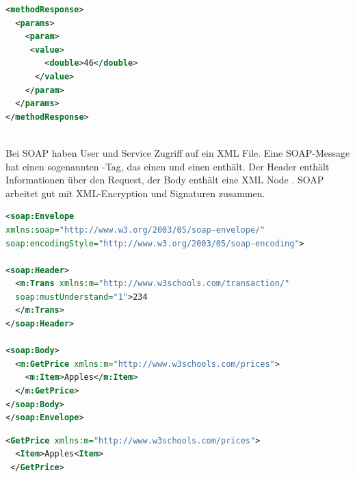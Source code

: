 \hfill
\begin{minipage}{0.45\textwidth}
\begin{lstlisting}[language=XML, caption={Web Service Response}, label=lst:webserviceresponse]
<methodResponse>
  <params>
	<param>
	 <value>
        <double>46</double>
      </value>
    </param>
  </params>
</methodResponse>
\end{lstlisting}
\end{minipage}\\
Bei SOAP haben User und Service Zugriff auf ein XML File. Eine SOAP-Message hat einen sogenannten -Tag, das einen  und einen  enthält. Der Header enthält Informationen über den Request, der Body enthält eine XML Node	. SOAP arbeitet gut mit XML-Encryption und Signaturen zusammen.\\
\begin{minipage}{0.45\textwidth}
\begin{lstlisting}[language=XML, caption={SOAP-Envelope}, label=lst:soapenvelope]
<soap:Envelope
xmlns:soap="http://www.w3.org/2003/05/soap-envelope/"
soap:encodingStyle="http://www.w3.org/2003/05/soap-encoding">

<soap:Header>
  <m:Trans xmlns:m="http://www.w3schools.com/transaction/"
  soap:mustUnderstand="1">234
  </m:Trans>
</soap:Header>

<soap:Body>
  <m:GetPrice xmlns:m="http://www.w3schools.com/prices">
    <m:Item>Apples</m:Item>
  </m:GetPrice>
</soap:Body>
</soap:Envelope>
\end{lstlisting}
\end{minipage}
\hfill
\begin{minipage}{0.45\textwidth}
\begin{lstlisting}[language=XML, caption={Extracted Message}, label=lst:soapextractedmessage] 
<GetPrice xmlns:m="http://www.w3schools.com/prices">
  <Item>Apples<Item>
 </GetPrice>
\end{lstlisting}
\end{minipage}\\

